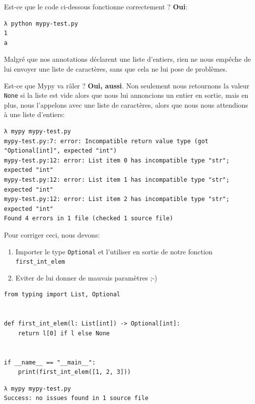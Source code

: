 \documentclass[11pt]{amsbook}
\begin{document}
Est-ce que le code ci-dessous fonctionne correctement ?
\textbf{Oui}:


\begin{verbatim}
λ python mypy-test.py
1
a
\end{verbatim}

Malgré que nos annotations déclarent une liste d’entiers, rien ne nous empêche de lui envoyer une liste de caractères, sans que cela ne lui pose de problèmes.


Est-ce que Mypy va râler ? \textbf{Oui, aussi}.
Non seulement nous retournons la valeur \texttt{None} si la liste est vide alors que nous lui annoncions un entier en sortie, mais en plus, nous l’appelons avec une liste de caractères, alors que nous nous attendions à une liste d’entiers:


\begin{verbatim}
λ mypy mypy-test.py
mypy-test.py:7: error: Incompatible return value type (got "Optional[int]", expected "int")
mypy-test.py:12: error: List item 0 has incompatible type "str"; expected "int"
mypy-test.py:12: error: List item 1 has incompatible type "str"; expected "int"
mypy-test.py:12: error: List item 2 has incompatible type "str"; expected "int"
Found 4 errors in 1 file (checked 1 source file)
\end{verbatim}

Pour corriger ceci, nous devons:


\begin{enumerate}

\item{Importer le type \texttt{Optional} et l’utiliser en sortie de notre fonction \texttt{first\_int\_elem}}

\item{Eviter de lui donner de
mauvais paramètres ;-)}

\end{enumerate}


\begin{verbatim}
from typing import List, Optional


def first_int_elem(l: List[int]) -> Optional[int]:
    return l[0] if l else None


if __name__ == "__main__":
    print(first_int_elem([1, 2, 3]))
\end{verbatim}

\begin{verbatim}
λ mypy mypy-test.py
Success: no issues found in 1 source file
\end{verbatim}
\end{document}
